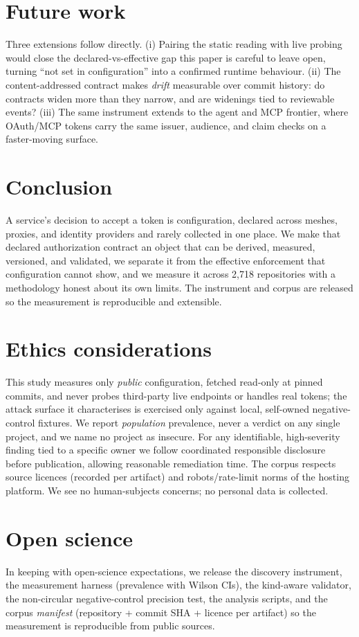 \section{Future work}\label{sec:future}
Three extensions follow directly. (i) Pairing the static reading with live probing
would close the declared-vs-effective gap this paper is careful to leave open,
turning ``not set in configuration'' into a confirmed runtime behaviour. (ii) The
content-addressed contract makes \emph{drift} measurable over commit history: do
contracts widen more than they narrow, and are widenings tied to reviewable events?
(iii) The same instrument extends to the agent and MCP frontier, where OAuth/MCP
tokens carry the same issuer, audience, and claim checks on a faster-moving surface.

\section{Conclusion}
A service's decision to accept a token is configuration, declared across meshes,
proxies, and identity providers and rarely collected in one place. We make that
declared authorization contract an object that can be derived, measured, versioned,
and validated, we separate it from the effective enforcement that configuration
cannot show, and we measure it across 2{,}718 repositories with a methodology
honest about its own limits. The instrument and corpus are released so the
measurement is reproducible and extensible.

\section*{Ethics considerations}\label{sec:ethics}
This study measures only \emph{public} configuration, fetched read-only at pinned
commits, and never probes third-party live endpoints or handles real tokens; the
attack surface it characterises is exercised only against local, self-owned
negative-control fixtures. We report \emph{population} prevalence, never a verdict
on any single project, and we name no project as insecure. For any identifiable,
high-severity finding tied to a specific owner we follow coordinated responsible
disclosure before publication, allowing reasonable remediation time. The corpus
respects source licences (recorded per artifact) and robots/rate-limit norms of the
hosting platform. We see no human-subjects concerns; no personal data is collected.

\section*{Open science}\label{sec:openscience}
In keeping with open-science expectations, we release the discovery instrument, the
measurement harness (prevalence with Wilson CIs), the kind-aware validator, the
non-circular negative-control precision test, the analysis scripts, and the corpus
\emph{manifest} (repository + commit SHA + licence per artifact) so the measurement
is reproducible from public sources. 

